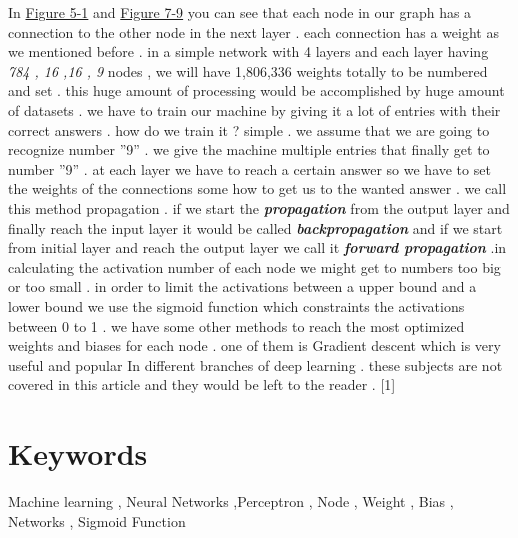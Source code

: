 \documentclass[12pt , a4paper]{article}
\begin{document}
In  \hyperref [f-5-1]{Figure 5-1}  and \hyperref [f-6-9]{Figure 7-9} you can see that each node in our graph has a connection to the other node in the next layer . each connection has a weight as we mentioned before . in a simple network with 4 layers and each layer having\textit{ 784 , 16 ,16 , 9 }nodes , we will have 1,806,336 weights totally to be numbered and set . this huge amount of processing would be accomplished by huge amount of datasets . we have to train our machine by giving it a lot of entries with their correct answers . how do we train it ? simple . we assume that we are going to recognize number ''9'' . we give the machine multiple entries that finally get to number ''9'' . at each layer we have to reach a certain answer so we have to set the weights of the connections some how to get us to the wanted answer . we call this method propagation . if we start the \textbf{\textit{propagation} } from the output layer and finally reach the input layer it would be called \textbf{\textit{backpropagation} }  and if we start from initial layer and reach the output layer we call it \textbf{\textit{forward propagation} } .in calculating the activation number of each node we might get to numbers too big or too small . in order to limit the activations between a upper bound and a lower bound we use the sigmoid function which constraints the activations between 0 to 1 . we have some other methods to reach the most optimized weights and biases for each node . one of them is Gradient descent which is very useful and popular In different branches of deep learning . these subjects are not covered in this article and they would be left to the reader . [1]

\section { Keywords } 
Machine learning , Neural Networks ,Perceptron , Node , Weight , Bias , Networks ,   Sigmoid Function 

\end{document}
